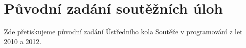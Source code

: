 \appendix

\chapter{Původní zadání soutěžních úloh}

Zde přetiskujeme původní zadání Ústředního kola Soutěže v programování z let
2010 a 2012.




